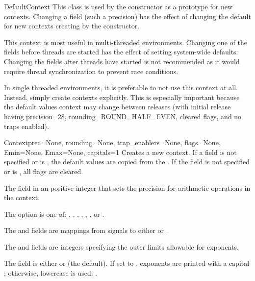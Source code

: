 \begin{classdesc*}{DefaultContext}
  This class is used by the  constructor as a prototype for
  new contexts.  Changing a field (such a precision) has the effect of
  changing the default for new contexts creating by the 
  constructor.

  This context is most useful in multi-threaded environments.  Changing one of
  the fields before threads are started has the effect of setting system-wide
  defaults.  Changing the fields after threads have started is not recommended
  as it would require thread synchronization to prevent race conditions.

  In single threaded environments, it is preferable to not use this context
  at all.  Instead, simply create contexts explicitly.  This is especially
  important because the default values context may change between releases
  (with initial release having precision=28, rounding=ROUND_HALF_EVEN,
  cleared flags, and no traps enabled).
\end{classdesc*}
                                          

\begin{classdesc}{Context}{prec=None, rounding=None, trap_enablers=None,
        flags=None, Emin=None, Emax=None, capitals=1}
  Creates a new context.  If a field is not specified or is ,
  the default values are copied from the .  If the
   field is not specified or is , all flags are
  cleared.

  The  field in an positive integer that sets the precision for
  arithmetic operations in the context.

  The  option is one of: ,
  , , ,
  , , or
  .

  The  and  fields are mappings from signals
  to either  or .

  The  and  fields are integers specifying the outer
  limits allowable for exponents.

  The  field is either  or  (the
  default). If set to , exponents are printed with a capital
  ; otherwise, lowercase is used:  .
\end{classdesc}

